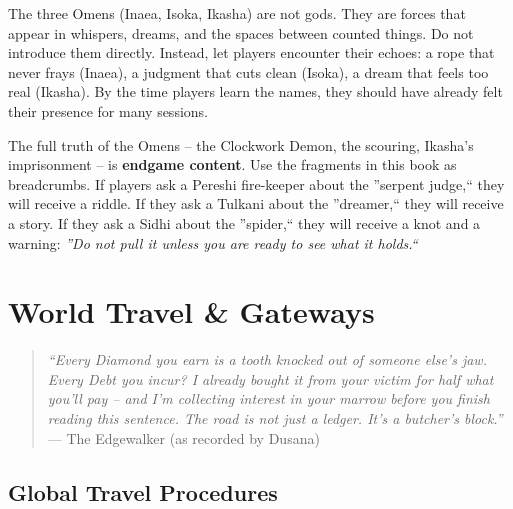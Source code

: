 \documentclass[11pt,letterpaper,twoside]{book}
\begin{document}
\begin{tcolorbox}[colback=black!2,colframe=red!70!black,title={For the GM: The Spider, the Snake, the Raven -- What to Reveal and When},breakable]
  The three Omens (Inaea, Isoka, Ikasha) are not gods. They are forces that appear in whispers, dreams, and the spaces between counted things. Do not introduce them directly. Instead, let players encounter their echoes: a rope that never frays (Inaea), a judgment that cuts clean (Isoka), a dream that feels too real (Ikasha). By the time players learn the names, they should have already felt their presence for many sessions.

  The full truth of the Omens -- the Clockwork Demon, the scouring, Ikasha's imprisonment -- is \textbf{endgame content}. Use the fragments in this book as breadcrumbs. If players ask a Pereshi fire-keeper about the ''serpent judge,`` they will receive a riddle. If they ask a Tulkani about the ''dreamer,`` they will receive a story. If they ask a Sidhi about the ''spider,`` they will receive a knot and a warning: \textit{''Do not pull it unless you are ready to see what it holds.``}
\end{tcolorbox}

\part{World Travel \& Gateways}
\begin{quote}
  \small
  \textit{``Every Diamond you earn is a tooth knocked out of someone else's jaw. Every Debt you incur? I already bought it from your victim for half what you'll pay -- and I'm collecting interest in your marrow before you finish reading this sentence. The road is not just a ledger. It's a butcher's block.''}
  \noindent --- The Edgewalker (as recorded by Dusana)
  \end{quote}


\chapter{Global Travel Procedures}
\label{chap:globaltravel}
\end{document}
